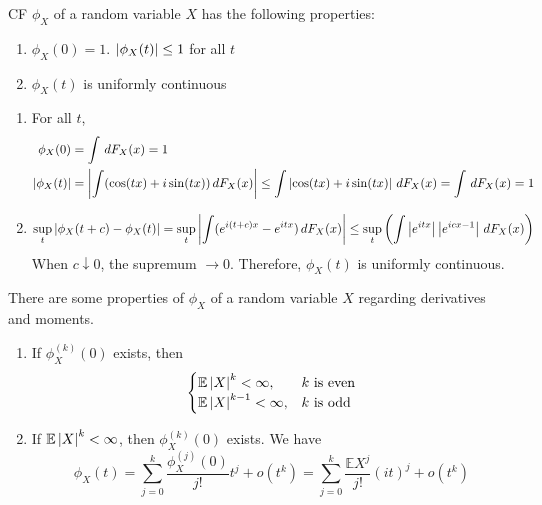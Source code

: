 \documentclass{huhtakm-template-book}
\newcommand{\expect}{\mathbb{E}}
\begin{document}
    \begin{lem}
        CF $\phi_{X}$ of a random variable $X$ has the following properties:
        \begin{enumerate}
            \item $\phi_{X}(0)=1$. $\left|{\phi_{X}(t)}\right|\leq 1$ for all $t$
            \item $\phi_{X}(t)$ is uniformly continuous
        \end{enumerate}
    \end{lem}
    \begin{proofing}
        \begin{enumerate}
            \item For all $t$,
            \begin{align*}
                \phi_{X}(0)&=\int\,dF_{X}(x)=1\\
                \left|{\phi_{X}(t)}\right|&=\left|{\int(\cos(tx)+i\sin(tx))\,dF_{X}(x)}\right|\leq\int\left|{\cos(tx)+i\sin(tx)}\right|\,dF_{X}(x)=\int\,dF_{X}(x)=1
            \end{align*}
            \item
            \begin{equation*}
                \sup_{t}\left|{\phi_{X}(t+c)-\phi_{X}(t)}\right|=\sup_{t}\left|{\int(e^{i(t+c)x}-e^{itx})\,dF_{X}(x)}\right|\leq\sup_{t}\left(\int\left|{e^{itx}}\right|\left|{e^{icx-1}}\right|\,dF_{X}(x)\right)
            \end{equation*}
            When $c\downarrow 0$, the supremum $\to 0$. Therefore, $\phi_{X}(t)$ is uniformly continuous.
        \end{enumerate}
    \end{proofing}
    \begin{thm}
        There are some properties of $\phi_{X}$ of a random variable $X$ regarding derivatives and moments.
        \begin{enumerate}
            \item If $\phi_{X}^{(k)}(0)$ exists, then
            \begin{equation*}
                \begin{cases}
                    \expect\abs{X}^{k}<\infty, &k\text{ is even}\\
                    \expect\abs{X}^{k-1}<\infty, &k\text{ is odd}
                \end{cases}
            \end{equation*}
            \item If $\expect\abs{X}^{k}<\infty$, then $\phi_{X}^{(k)}(0)$ exists. We have
            \begin{equation*}
                \phi_{X}(t)=\sum_{j=0}^{k}\frac{\phi_{X}^{(j)}(0)}{j!}t^{j}+o(t^{k})=\sum_{j=0}^{k}\frac{\expect X^{j}}{j!}(it)^{j}+o(t^{k})
            \end{equation*}
        \end{enumerate}
    \end{thm}
\end{document}
